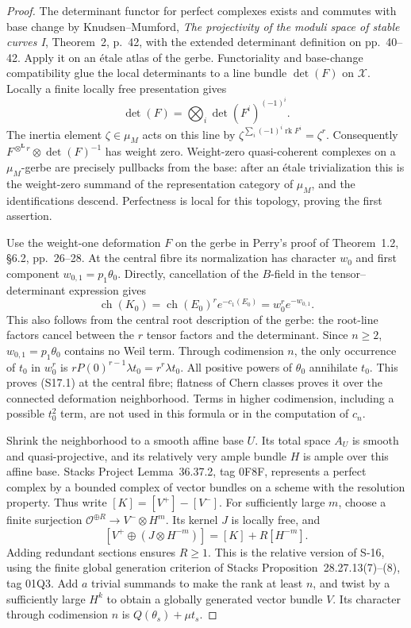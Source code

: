 \documentclass[11pt,a4paper]{article}
\theoremstyle{definition}
\begin{document}
\begin{proof}
The determinant functor for perfect complexes exists and commutes
with base change by Knudsen--Mumford, \emph{The projectivity of the
moduli space of stable curves I}, Theorem~2, p.~42, with the
extended determinant definition on pp.~40--42. Apply it on an
\'etale atlas of the gerbe. Functoriality and base-change
compatibility glue the local determinants to a line bundle
$\det(F)$ on $\mathcal X$. Locally a finite locally free
presentation gives
\[
 \det(F)=\bigotimes_i\det(F^i)^{(-1)^i}.
\]
The inertia element $\zeta\in\mu_M$ acts on this line by
$\zeta^{\sum_i(-1)^i\operatorname{rk}F^i}=\zeta^r$.
Consequently $F^{\otimes^{\mathbf L}r}\otimes\det(F)^{-1}$
has weight zero. Weight-zero quasi-coherent complexes on a
$\mu_M$-gerbe are precisely pullbacks from the base: after an
\'etale trivialization this is the weight-zero summand of the
representation category of $\mu_M$, and the identifications
descend. Perfectness is local for this topology, proving the
first assertion.

Use the weight-one deformation $F$ on the gerbe in Perry's proof
of Theorem~1.2, \S6.2, pp.~26--28. At the central fibre its
normalization has character $w_0$ and first component
$w_{0,1}=p_1\theta_0$. Directly, cancellation of the $B$-field
in the tensor--determinant expression gives
\[
 \operatorname{ch}(K_0)
 =\operatorname{ch}(E_0)^r
       e^{-c_1(E_0)}
 =w_0^r e^{-w_{0,1}} .
\]
This also follows from the central root description of the gerbe:
the root-line factors cancel between the $r$ tensor factors and
the determinant. Since $n\ge2$, $w_{0,1}=p_1\theta_0$ contains
no Weil term. Through codimension $n$, the only occurrence of
$t_0$ in $w_0^r$ is
$rP(0)^{r-1}\lambda t_0=r^r\lambda t_0$.
All positive powers of $\theta_0$ annihilate $t_0$.
This proves (S17.1) at the central fibre; flatness of Chern classes
proves it over the connected deformation neighborhood.
Terms in higher codimension, including a possible $t_0^2$ term,
are not used in this formula or in the computation of $c_n$.

Shrink the neighborhood to a smooth affine base $U$.
Its total space $A_U$ is smooth and quasi-projective, and its
relatively very ample bundle $H$ is ample over this affine base.
Stacks Project Lemma~36.37.2, tag 0F8F, represents a perfect
complex by a bounded complex of vector bundles on a scheme
with the resolution property. Thus write
$[K]=[V^+]-[V^-]$. For sufficiently large $m$, choose a finite
surjection $\mathcal O^{\oplus R}\to V^-\otimes H^m$.
Its kernel $J$ is locally free, and
\[
 [V^+\oplus(J\otimes H^{-m})]=[K]+R[H^{-m}].
\]
Adding redundant sections ensures $R\ge1$.
This is the relative version of S-16, using the finite global
generation criterion of Stacks Proposition~28.27.13(7)--(8),
tag 01Q3. Add $a$ trivial summands to make the rank at least $n$,
and twist by a sufficiently large $H^k$ to obtain a globally
generated vector bundle $V$. Its character through codimension
$n$ is $Q(\theta_s)+\mu t_s$.


\end{proof}
\end{document}
